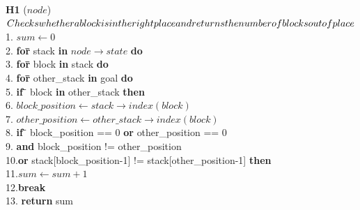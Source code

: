 \documentclass{article}
\begin{document}
\begin{center}
\begin{tabbing}
\textbf{H1} ($node$) \\
\rhd$ Checks whether a block is in the right place and returns \\the number of blocks out of place $\\
1. \indent $sum \leftarrow 0$ \\
2. \indent \textbf{for\=} stack \textbf{in} $node \rightarrow state$ \textbf{do} \\
3. \indent \>\textbf{for\=} block \textbf{in} stack \textbf{do} \\
4. \indent \>\>\textbf{for\=} {other\_stack} \textbf{in} goal \textbf{do} \\
5. \indent \>\>\>\textbf{if \=} block \textbf{in} {other\_stack} \textbf{then}\\
6. \indent \>\>\>\>$block\_position\leftarrow stack\rightarrow index(block)$\\
7. \indent \>\>\>\>$other\_position\leftarrow other\_stack\rightarrow index(block)$\\
8. \indent \>\>\>\>\textbf{if \=} {block\_position} == 0 \textbf{or} {other\_position == 0 } \\ 
9. \>\>\>\>\textbf{and} {block\_position} != {other\_position}\\  10.\>\>\>\>\textbf{or} stack[{block\_position}-1] != stack[{other\_position}-1] \textbf{then}\\
11.\>\>\>\>\>$sum\leftarrow sum + 1$\\
12.\>\>\>\>\>\textbf{break}\\
13. \indent \textbf{return} sum\\
\vspace{8cm}
\vfill

\end{tabbing}
\end{center}
\end{document}

